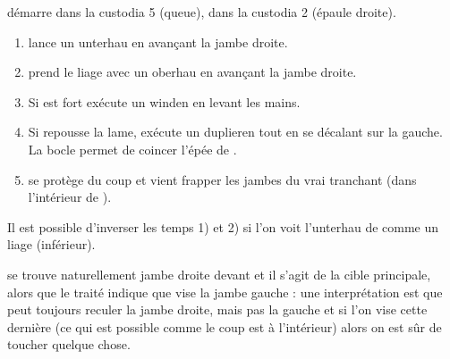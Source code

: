 \begin{technique}[Liegniczer 2]
\label{épée-bocle:tech:liegniczer:2}

\A démarre dans la custodia 5 (queue), \D dans la custodia 2 (épaule droite).

\begin{enumerate}
	\item \A lance un unterhau en avançant la jambe droite.
	
	\item \D prend le liage avec un oberhau en avançant la jambe droite.
	
	\item {}
		Si \D est fort \A exécute un winden en levant les mains.
	
	\item {}
		Si \D repousse la lame, \A exécute un duplieren tout en se décalant sur la gauche.
		La bocle permet de coincer l'épée de \D.
	
	\item \D se protège du coup et \A vient frapper les jambes du vrai tranchant (dans l'intérieur de \D).
\end{enumerate}

Il est possible d'inverser les temps 1) et 2) si l'on voit l'unterhau de \A comme un liage (inférieur).

\D se trouve naturellement jambe droite devant et il s'agit de la cible principale, alors que le traité indique que \A vise la jambe gauche : une interprétation est que \D peut toujours reculer la jambe droite, mais pas la gauche et si l'on vise cette dernière (ce qui est possible comme le coup est à l'intérieur) alors on est sûr de toucher quelque chose.

\end{technique}



